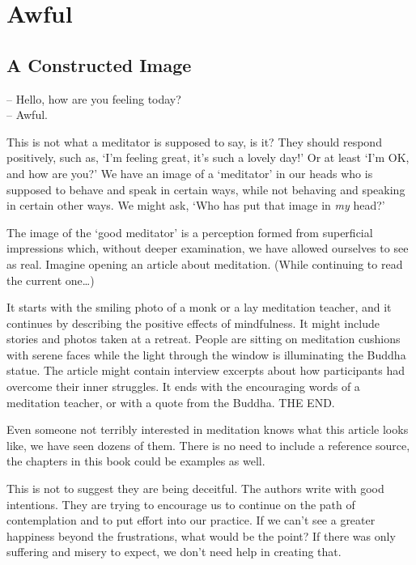 \chapter{Awful}

\section{A Constructed Image}


\noindent -- Hello, how are you feeling today?\\
-- Awful.

This is not what a meditator is supposed to say, is it? They should
respond positively, such as, `I'm feeling great, it's such a lovely
day!' Or at least `I'm OK, and how are you?' We have an image of a
`meditator' in our heads who is supposed to behave and speak in certain
ways, while not behaving and speaking in certain other ways. We might
ask, `Who has put that image in \emph{my} head?'

The image of the `good meditator' is a perception formed from
superficial impressions which, without deeper examination, we have
allowed ourselves to see as real. Imagine opening an article about
meditation. (While continuing to read the current one\ldots)

\enlargethispage*{\baselineskip}

It starts with the smiling photo of a monk or a lay meditation teacher,
and it continues by describing the positive effects of mindfulness. It
might include stories and photos taken at a retreat. People are sitting
on meditation cushions with serene faces while the light through the
window is illuminating the Buddha statue. The article might contain
interview excerpts about how participants had overcome their inner
struggles. It ends with the encouraging words of a meditation teacher,
or with a quote from the Buddha. THE END.

Even someone not terribly interested in meditation knows what this
article looks like, we have seen dozens of them. There is no need to
include a reference source, the chapters in this book could be examples
as well.

This is not to suggest they are being deceitful. The authors write with
good intentions. They are trying to encourage us to continue on the path
of contemplation and to put effort into our practice. If we can't see a
greater happiness beyond the frustrations, what would be the point? If
there was only suffering and misery to expect, we don't need help in
creating that.

